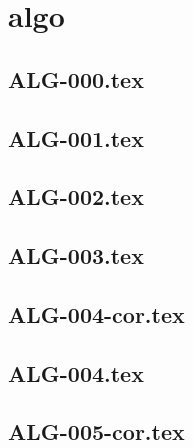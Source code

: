 \section*{algo}
\renewcommand{\xxexo}{ALG-000.tex} 
\subsection*{\xxexo} 
\graphicspath{{../../exosalgo/equadiffs/\xxexo/}}
 
 
\renewcommand{\xxexo}{ALG-001.tex} 
\subsection*{\xxexo} 
\graphicspath{{../../exosalgo/equadiffs/\xxexo/}}
 
 
\renewcommand{\xxexo}{ALG-002.tex} 
\subsection*{\xxexo} 
\graphicspath{{../../exosalgo/equadiffs/\xxexo/}}
 
 
\renewcommand{\xxexo}{ALG-003.tex} 
\subsection*{\xxexo} 
\graphicspath{{../../exosalgo/equadiffs/\xxexo/}}
 
 
\renewcommand{\xxexo}{ALG-004-cor.tex} 
\subsection*{\xxexo} 
\graphicspath{{../../exosalgo/equadiffs/\xxexo/}}
 
 
\renewcommand{\xxexo}{ALG-004.tex} 
\subsection*{\xxexo} 
\graphicspath{{../../exosalgo/equadiffs/\xxexo/}}
 
 
\renewcommand{\xxexo}{ALG-005-cor.tex} 
\subsection*{\xxexo} 
\graphicspath{{../../exosalgo/equadiffs/\xxexo/}}
 
 
